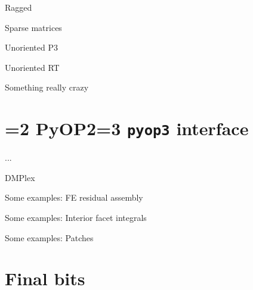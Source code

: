\documentclass{beamer}
\def\pyop#1{\ifnum#1=2 {PyOP2}\else \ifnum#1=3 {\texttt{pyop3}}\fi \fi}
\begin{document}
\begin{frame}{Ragged}

\end{frame}

\begin{frame}{Sparse matrices}
\end{frame}

\begin{frame}{Unoriented P3}

\end{frame}

\begin{frame}{Unoriented RT}

\end{frame}

\begin{frame}{Something really crazy}
\end{frame}

\section{\pyop3 interface}

\begin{frame}{...}
\end{frame}

\begin{frame}{DMPlex}
\end{frame}

\begin{frame}{Some examples: FE residual assembly}

\end{frame}

\begin{frame}{Some examples: Interior facet integrals}

\end{frame}

\begin{frame}{Some examples: Patches}

\end{frame}

\section{Final bits}
\end{document}
